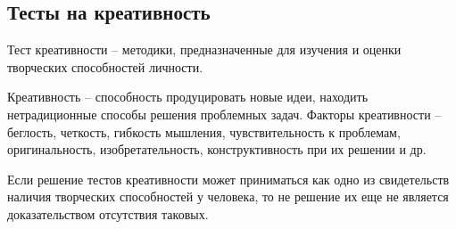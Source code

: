 \subsection*{Тесты на креативность}
Тест креативности – методики, предназначенные для изучения и 
оценки творческих способностей личности.

Креативность – способность продуцировать новые идеи, находить 
нетрадиционные способы решения проблемных задач. 
Факторы креативности – беглость, четкость, гибкость мышления, 
чувствительность к проблемам, оригинальность, изобретательность, 
конструктивность при их решении и др.

Если решение тестов креативности может приниматься как одно из 
свидетельств наличия творческих способностей у человека, то не 
решение их еще не является доказательством отсутствия таковых.

